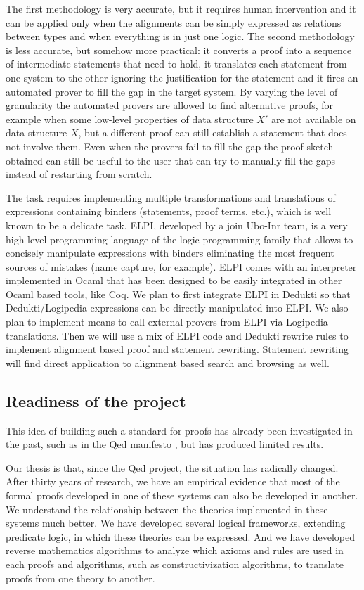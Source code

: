 The first methodology is very accurate, but it requires human
intervention and it can be applied only when the alignments can be
simply expressed as relations between types and when everything is in
just one logic. The second methodology is less accurate, but somehow
more practical: it converts a proof into a sequence of intermediate
statements that need to hold, it translates each statement from one
system to the other ignoring the justification for the statement and
it fires an automated prover to fill the gap in the target system. By
varying the level of granularity the automated provers are allowed to
find alternative proofs, for example when some low-level properties of
data structure $X'$ are not available on data structure $X$, but a
different proof can still establish a statement that does not involve
them. Even when the provers fail to fill the gap the proof sketch
obtained can still be useful to the user that can try to manually fill
the gaps instead of restarting from scratch.

The task requires implementing multiple transformations and
translations of expressions containing binders (statements, proof
terms, etc.), which is well known to be a delicate task. ELPI,
developed by a join Ubo-Inr team, is a very high level programming
language of the logic programming family that allows to concisely
manipulate expressions with binders eliminating the most frequent
sources of mistakes (name capture, for example). ELPI comes with an
interpreter implemented in Ocaml that has been designed to be easily
integrated in other Ocaml based tools, like Coq. We plan to first
integrate ELPI in Dedukti so that Dedukti/Logipedia expressions can be
directly manipulated into ELPI. We also plan to implement means to
call external provers from ELPI via Logipedia translations. Then we
will use a mix of ELPI code and Dedukti rewrite rules to implement
alignment based proof and statement rewriting. Statement rewriting
will find direct application to alignment based search and browsing as
well.


\subsection{Readiness of the project}

This idea of building such a standard for proofs has already been
investigated in the past, such as in the Qed manifesto \cite{Qed94}, but
has produced limited results.

Our thesis is that, since the
Qed project, the situation has radically changed. After
thirty years of research, we have an empirical evidence that most of
the formal proofs developed in one of these systems can also be
developed in another. We understand the relationship between the
theories implemented in these systems much better. We have developed
several logical frameworks, extending predicate logic, in which these
theories can be expressed. And we have developed reverse mathematics
algorithms to analyze which axioms and rules are used in each proofs
and algorithms, such as constructivization algorithms, to translate
proofs from one theory to another.



